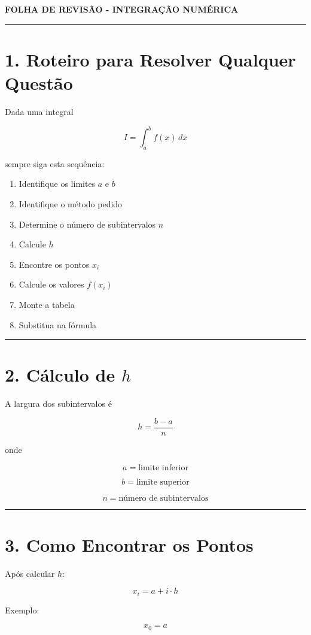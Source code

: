 \documentclass[12pt,a4paper]{article}
\begin{document}
\begin{center}
{\LARGE \textbf{FOLHA DE REVISÃO - INTEGRAÇÃO NUMÉRICA}}
\end{center}

\hrule

\section*{1. Roteiro para Resolver Qualquer Questão}

Dada uma integral

\[
I=\int_a^b f(x)\,dx
\]

sempre siga esta sequência:

\begin{enumerate}
\item Identifique os limites \(a\) e \(b\)
\item Identifique o método pedido
\item Determine o número de subintervalos \(n\)
\item Calcule \(h\)
\item Encontre os pontos \(x_i\)
\item Calcule os valores \(f(x_i)\)
\item Monte a tabela
\item Substitua na fórmula
\end{enumerate}

\hrule

\section*{2. Cálculo de \(h\)}

A largura dos subintervalos é

\[
h=\frac{b-a}{n}
\]

onde

\[
a=\text{limite inferior}
\]

\[
b=\text{limite superior}
\]

\[
n=\text{número de subintervalos}
\]

\hrule

\section*{3. Como Encontrar os Pontos}

Após calcular \(h\):

\[
x_i=a+i\cdot h
\]

Exemplo:

\[
x_0=a
\]
\end{document}
